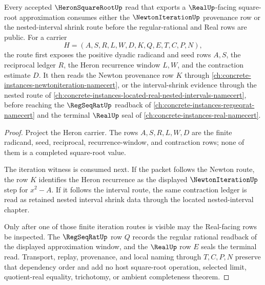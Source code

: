 \begin{theorem}
\label{thm:heron-square-root-newton-interval-dependency}
Every accepted $\HeronSquareRootUp$ read that exports a $\RealUp$-facing square-root approximation consumes either the $\NewtonIterationUp$ provenance row or the nested-interval shrink route before the regular-rational and Real rows are public. For a carrier
$$
H=(A,S,R,L,W,D,K,Q,E,T,C,P,N),
$$
the route first exposes the positive dyadic radicand and seed rows $A,S$, the reciprocal ledger $R$, the Heron recurrence window $L,W$, and the contraction estimate $D$. It then reads the Newton provenance row $K$ through \autoref{ch:concrete-instances-newtoniteration-namecert}, or the interval-shrink evidence through the nested route of \autoref{ch:concrete-instances-located-real-nested-intervals-namecert}, before reaching the $\RegSeqRatUp$ readback of \autoref{ch:concrete-instances-regseqrat-namecert} and the terminal $\RealUp$ seal of \autoref{ch:concrete-instances-real-namecert}.
\end{theorem}
\begin{proof}
Project the Heron carrier. The rows $A,S,R,L,W,D$ are the finite radicand, seed, reciprocal, recurrence-window, and contraction rows; none of them is a completed square-root value.

The iteration witness is consumed next. If the packet follows the Newton route, the row $K$ identifies the Heron recurrence as the displayed $\NewtonIterationUp$ step for $x^2-A$. If it follows the interval route, the same contraction ledger is read as retained nested interval shrink data through the located nested-interval chapter.

Only after one of those finite iteration routes is visible may the Real-facing rows be inspected. The $\RegSeqRatUp$ row $Q$ records the regular rational readback of the displayed approximation window, and the $\RealUp$ row $E$ seals the terminal read. Transport, replay, provenance, and local naming through $T,C,P,N$ preserve that dependency order and add no host square-root operation, selected limit, quotient-real equality, trichotomy, or ambient completeness theorem.
\end{proof}
